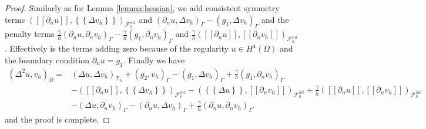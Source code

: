 \documentclass[11pt]{article}
\theoremstyle{remark}
\newcommand{\mean}[1]{\left\{\!\!\left\{#1\right\}\!\!\right\}}
\newcommand{\jump}[1]{\left[\!\left[ #1 \right]\!\right]}
\numberwithin{equation}{section}
\begin{document}
\begin{proof}
Similarly as for Lemma \ref{lemma:hessian}, we add consistent symmetry terms $(  \jump{ \partial _{n} u }, \mean{ \Delta  v_{h} })_{\mathcal{F}^{int}_{h} } $ and $(  \partial _{n} u, \Delta  v_{h}       )_{\Gamma  } -(  g_{1}, \Delta  v_{h}  )_{\Gamma  }  $ and
the penalty terms $ \frac{\gamma }{h} (  \partial _{n} u, \partial _{n}   v_{h}       )_{\Gamma  } -\frac{\gamma }{h}(  g_{1}, \partial _{n} v_{h}  )_{\Gamma  }$ and $\frac{\gamma }{h}( \jump{ \partial _{n} u } , \jump{ \partial _{n} v_{h} }
)_{\mathcal{F}^{int}_{h} }  $  . Effectively is the terms adding zero
because of the regularity $ u \in H^{4}( \Omega ) $ and the boundary condition $\partial _{n} u = g_{1}$.
Finally we have
\[
    \begin{split}
( \Delta ^2 u, v_{h} ) _{\Omega }  =& ( \Delta u, \Delta v_{h})_{\mathcal{T} _{h} }  + ( g_{2} , v_{h} )_{\Gamma }  - ( g_{1} , \Delta v_{h})_{\Gamma } + \frac{\gamma }{h} ( g_{1} ,  \partial _{n}v_{h})_{\Gamma }\\
& -  ( \jump{ \partial _{n} u} , \mean{ \Delta v_{h} })_{\mathcal{F}_{h}^{int} }-  (  \mean{ \Delta u }, \jump{ \partial _{n} v_{h}} )_{\mathcal{F}_{h}^{int} } + \frac{\gamma }{h}  \left( \jump{ \partial _{n} u}, \jump{ \partial _{n} v_{h}   }
\right)_{\mathcal{F}_{h}^{int} } \\
& - (  \Delta u , \partial _{n} v_{h})_{\Gamma }- ( \partial _{n} u, \Delta v_{h})_{\Gamma } + \frac{\gamma }{h}( \partial _{n} u, \partial _{n} v_{h})_{\Gamma }   .
    \end{split}
\]
and the proof is complete.
\end{proof}
\end{document}
